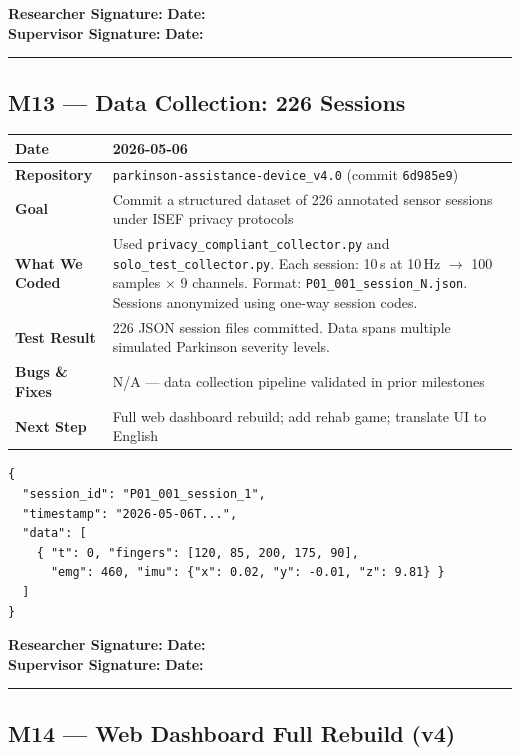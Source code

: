 \documentclass[12pt,a4paper]{article}
\makeatletter
\newcommand{\sigblock}{%
  \vspace{0.6em}
  \noindent\textbf{Researcher Signature:} \underline{\hspace{6cm}} \quad \textbf{Date:} \underline{\hspace{3cm}}\\[0.4em]
  \noindent\textbf{Supervisor Signature:} \underline{\hspace{6cm}} \quad \textbf{Date:} \underline{\hspace{3cm}}
  \vspace{0.4em}\hrule\vspace{0.6em}
}
\newenvironment{milestonetable}{%
  \begin{tcolorbox}[colback=codebg, colframe=codeframe, breakable, left=4pt, right=4pt, top=4pt, bottom=4pt]
  \begin{tabularx}{\linewidth}{@{}>{\bfseries}p{3.2cm} X@{}}
  \toprule
}{%
  \bottomrule
  \end{tabularx}
  \end{tcolorbox}
}
\newcommand{\mrow}[2]{\midrule #1 & #2 \\}
\makeatother
\begin{document}
\sigblock

\subsection{M13 --- Data Collection: 226 Sessions}

\begin{milestonetable}
\mrow{Date}{2026-05-06}
\mrow{Repository}{\texttt{parkinson-assistance-device\_v4.0} (commit \texttt{6d985e9})}
\mrow{Goal}{Commit a structured dataset of 226 annotated sensor sessions under ISEF privacy protocols}
\mrow{What We Coded}{Used \texttt{privacy\_compliant\_collector.py} and \texttt{solo\_test\_collector.py}. Each session: 10\,s at 10\,Hz $\rightarrow$ 100 samples $\times$ 9 channels. Format: \texttt{P01\_001\_session\_N.json}. Sessions anonymized using one-way session codes.}
\mrow{Test Result}{226 JSON session files committed. Data spans multiple simulated Parkinson severity levels.}
\mrow{Bugs \& Fixes}{N/A --- data collection pipeline validated in prior milestones}
\mrow{Next Step}{Full web dashboard rebuild; add rehab game; translate UI to English}
\end{milestonetable}

\begin{lstlisting}[style=jsonstyle, caption={Session file format}]
{
  "session_id": "P01_001_session_1",
  "timestamp": "2026-05-06T...",
  "data": [
    { "t": 0, "fingers": [120, 85, 200, 175, 90],
      "emg": 460, "imu": {"x": 0.02, "y": -0.01, "z": 9.81} }
  ]
}
\end{lstlisting}

\sigblock

\subsection{M14 --- Web Dashboard Full Rebuild (v4)}
\end{document}
